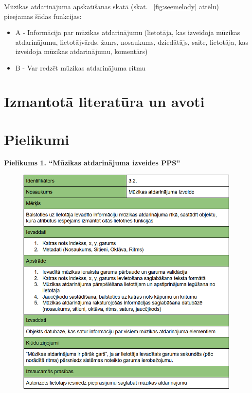 \documentclass[12pt]{article}
\begin{document}
Mūzikas atdarinājuma apskatīšanas skatā (skat. ~\ref{fig:seemelody} attēlu) pieejamas šādas funkcijas:

\begin{itemize}
	\item A - Informācija par mūzikas atdarinājumu (lietotāja, kas izveidoja mūzikas atdarinājumu, lietotājvārds, žanrs, nosaukums, dziedātājs, saite, lietotāja, kas izveidoja mūzikas atdarinājumu, komentārs)
	\item B - Var redzēt mūzikas atdarinājuma ritmu
\end{itemize}

\pagebreak

\section*{Izmantotā literatūra un avoti}

\printbibliography

\pagebreak

\section{Pielikumi}

\centering \textbf{Pielikums 1. ``Mūzikas atdarinājuma izveides PPS''}
\begin{figure}[H]
\begin{center}
	\includegraphics[scale=0.8]{Capture3.png}
	\label{fig:muzikasPPS}
\end{center}
\end{figure}
\end{document}
